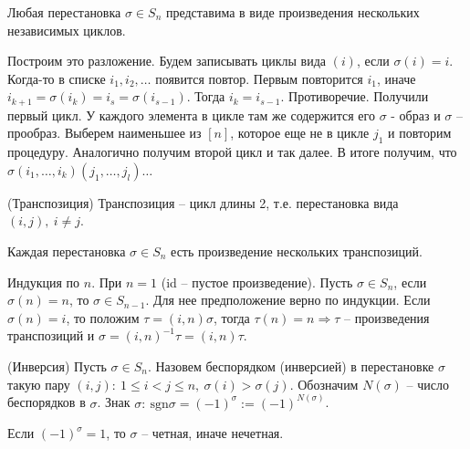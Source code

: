 \begin{multicols}{2}
\begin{proposition}{}{}
    Любая перестановка $\sigma \in S_n$ представима в виде произведения нескольких независимых циклов.
\end{proposition}
Построим это разложение. Будем записывать циклы вида $(i)$, если $\sigma(i) = i$. Когда-то в списке $i_1, i_2, \ldots$ появится повтор. Первым повторится $i_1$, иначе $i_{k+1} = \sigma(i_k) = i_s = \sigma(i_{s-1})$. Тогда $i_k = i_{s-1}$. Противоречие. Получили первый цикл. У каждого элемента в цикле там же содержится его $\sigma$ - образ и $\sigma$ -- прообраз. Выберем наименьшее из $[n]$, которое еще не в цикле $j_1$ и повторим процедуру. Аналогично получим второй цикл и так далее. В итоге получим, что $\sigma (i_1, \ldots, i_k)(j_1, \ldots, j_l)\ldots$
\begin{definition}{(Транспозиция)}{}
    Транспозиция -- цикл длины 2, т.е. перестановка вида $(i,j), \ i\neq j.$
\end{definition}
\begin{proposition}{}{}
Каждая перестановка $\sigma \in S_n$ есть произведение нескольких транспозиций.
\end{proposition}
Индукция по $n$. При $n=1$ (id -- пустое произведение). Пусть $\sigma \in S_n$, если $\sigma(n) = n$, то $\sigma \in S_{n-1}$. Для нее предположение верно по индукции. Если $\sigma(n) = i$, то положим $\tau = (i,n)\sigma$, тогда $\tau(n) = n \Rightarrow \tau$ -- произведения транспозиций и $\sigma = (i,n)^{-1}\tau = (i, n)\tau$.
\begin{definition}{(Инверсия)}{}
    Пусть $\sigma\in S_n$. Назовем беспорядком (инверсией) в перестановке $\sigma$ такую пару $(i,j): \ 1 \leq i < j \leq n, \ \sigma(i) > \sigma(j)$. Обозначим $N(\sigma)$ -- число беспорядков в $\sigma$. Знак $\sigma: \ \mathrm{sgn} \sigma = (-1)^\sigma := (-1)^{N(\sigma)}$.
\end{definition}
Если $(-1)^\sigma = 1$, то $\sigma$ -- четная, иначе нечетная.

\end{multicols}
